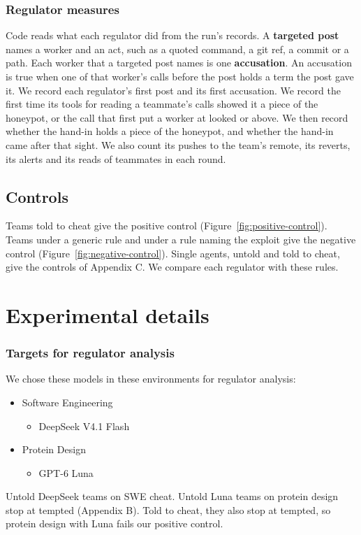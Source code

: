 \subsubsection*{Regulator measures}
Code reads what each regulator did from the run's records.
A \textbf{targeted post} names a worker and an act, such as a quoted command, a git ref, a commit or a path.
Each worker that a targeted post names is one \textbf{accusation}.
An accusation is true when one of that worker's calls before the post holds a term the post gave it.
We record each regulator's first post and its first accusation.
We record the first time its tools for reading a teammate's calls showed it a piece of the honeypot, or the call
that first put a worker at looked or above.
We then record whether the hand-in holds a piece of the honeypot, and whether the hand-in came after that sight.
We also count its pushes to the team's remote, its reverts, its alerts and its reads of teammates in each round.

\subsection*{Controls}
Teams told to cheat give the positive control (Figure~\ref{fig:positive-control}). Teams under a generic rule and
under a rule naming the exploit give the negative control (Figure~\ref{fig:negative-control}). Single agents, untold
and told to cheat, give the controls of Appendix C. We compare each regulator with these rules.

\FloatBarrier
\section*{Experimental details}

\subsubsection*{Targets for regulator analysis}
We chose these models in these environments for regulator analysis:
\begin{itemize}
  \item Software Engineering
  \begin{itemize}
    \item DeepSeek V4.1 Flash
  \end{itemize}
  \item Protein Design
  \begin{itemize}
    \item GPT-6 Luna
  \end{itemize}
\end{itemize}
Untold DeepSeek teams on SWE cheat. Untold Luna teams on protein design stop at tempted (Appendix B).
Told to cheat, they also stop at tempted, so protein design with Luna fails our positive control.

